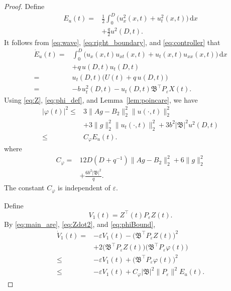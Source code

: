 \documentclass{IEEEtran}
\theoremstyle{definition}
\begin{document}
\begin{proof}
Define
\begin{equation}
\begin{aligned}
 E_u(t)={}&\frac12\int_0^D\bigl(u_x^2(x,t)+u_t^2(x,t)\bigr)\,\mathrm dx\\
 &+\frac q2u^2(D,t).
\end{aligned}
\label{eq:Eu}
\end{equation}
It follows from \eqref{eq:wave}, \eqref{eq:right_boundary},
and \eqref{eq:controller} that
\begin{equation}
\begin{aligned}
\dot E_u(t)
={}&\int_0^D\bigl(u_x(x,t)u_{xt}(x,t)
 +u_t(x,t)u_{xx}(x,t)\bigr)\,\mathrm dx\\
 &+q\,u(D,t)u_t(D,t)\\
={}&u_t(D,t)\bigl(U(t)+q\,u(D,t)\bigr)\\
={}&-b\,u_t^2(D,t)-u_t(D,t)\mathfrak B^\top P_\varepsilon X(t).
\end{aligned}
\label{eq:EuDot}
\end{equation}
Using \eqref{eq:Z}, \eqref{eq:phi_def}, and Lemma~\ref{lem:poincare},
we have
\begin{equation}
\begin{aligned}
|\varphi(t)|^2\leq{}&3\|Ag-B_2\|_2^2\|u(\cdot,t)\|_2^2\\
 &+3\|g\|_2^2\|u_t(\cdot,t)\|_2^2
 +3b^2|\mathfrak B|^2u^2(D,t)\\
\leq{}&C_\varphi E_u(t).
\end{aligned}
\label{eq:phiBound}
\end{equation}
where
\begin{equation}
\begin{aligned}
 C_\varphi={}&12D(D+q^{-1})\|Ag-B_2\|_2^2+6\|g\|_2^2\\
 &+\frac{6b^2|\mathfrak B|^2}{q}.
\end{aligned}
\label{eq:Cphi}
\end{equation}
The constant $C_\varphi$ is independent of $\varepsilon$.

Define
\begin{equation}
 V_1(t)=Z^\top(t)P_\varepsilon Z(t).
\label{eq:V1}
\end{equation}
By \eqref{eq:main_are}, \eqref{eq:Zdot2}, and
\eqref{eq:phiBound},
\begin{equation}
\begin{aligned}
\dot V_1(t)
={}&-\varepsilon V_1(t)
  -\bigl(\mathfrak B^\top P_\varepsilon Z(t)\bigr)^2\\
 &+2\bigl(\mathfrak B^\top P_\varepsilon Z(t)\bigr)
   \bigl(\mathfrak B^\top P_\varepsilon\varphi(t)\bigr)\\
\leq{}&-\varepsilon V_1(t)
 +\bigl(\mathfrak B^\top P_\varepsilon\varphi(t)\bigr)^2\\
\leq{}&-\varepsilon V_1(t)
 +C_\varphi|\mathfrak B|^2\|P_\varepsilon\|^2E_u(t).
\end{aligned}
\label{eq:V1dot2}
\end{equation}


\end{proof}
\end{document}
